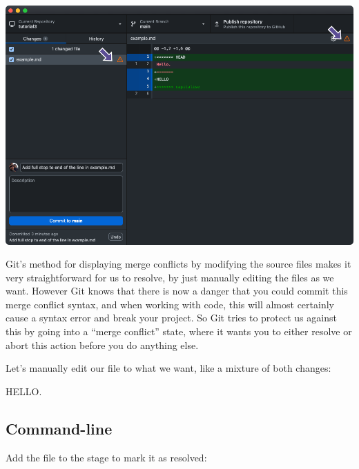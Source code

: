 \documentclass[
  letterpaper,
  DIV=11,
  numbers=noendperiod]{scrartcl}
\begin{document}
\includegraphics{images/image54.png}

Git's method for displaying merge conflicts by modifying the source
files makes it very straightforward for us to resolve, by just manually
editing the files as we want. However Git knows that there is now a
danger that you could commit this merge conflict syntax, and when
working with code, this will almost certainly cause a syntax error and
break your project. So Git tries to protect us against this by going
into a ``merge conflict'' state, where it wants you to either resolve or
abort this action before you do anything else.

Let's manually edit our file to what we want, like a mixture of both
changes:

\begin{tcolorbox}[enhanced jigsaw, opacitybacktitle=0.6, arc=.35mm, toprule=.15mm, leftrule=.75mm, colbacktitle=quarto-callout-note-color!10!white, bottomrule=.15mm, rightrule=.15mm, opacityback=0, title=\textcolor{quarto-callout-note-color}{\faInfo}\hspace{0.5em}{example.md}, toptitle=1mm, breakable, left=2mm, colback=white, titlerule=0mm, bottomtitle=1mm, coltitle=black, colframe=quarto-callout-note-color-frame]

HELLO.

\end{tcolorbox}

\subsection{Command-line}

Add the file to the stage to mark it as resolved:
\end{document}
